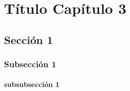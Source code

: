 \chapter{Título Capítulo 3}

\lipsum[5]

\section{Sección 1}

\lipsum[6]

\subsection{Subsección 1}

\lipsum[7]

\subsubsection{subsubsección 1}

\lipsum[8]
